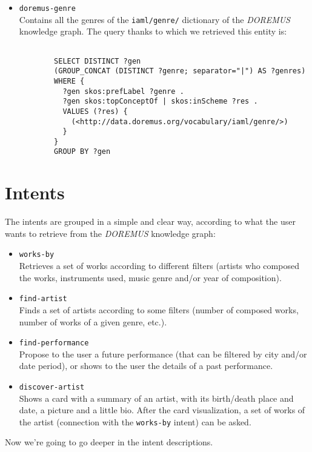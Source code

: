 \begin{itemize}
		\item \texttt{doremus-genre}\\
		Contains all the genres of the \texttt{iaml/genre/} dictionary of the \textit{DOREMUS} knowledge graph. The query thanks to which we retrieved this entity is:
		\begin{lstlisting}
		
		SELECT DISTINCT ?gen
		(GROUP_CONCAT (DISTINCT ?genre; separator="|") AS ?genres)
		WHERE {
		  ?gen skos:prefLabel ?genre .
		  ?gen skos:topConceptOf | skos:inScheme ?res .
		  VALUES (?res) {
		    (<http://data.doremus.org/vocabulary/iaml/genre/>)
		  }
		}
		GROUP BY ?gen
		\end{lstlisting}
	\end{itemize}

	\section{Intents}
	The intents are grouped in a simple and clear way, according to what the user wants to retrieve from the \textit{DOREMUS} knowledge graph:
	\begin{itemize}
		\item \texttt{works-by}\\
		Retrieves a set of works according to different filters (artists who composed the works, instruments used, music genre and/or year of composition).
		\item \texttt{find-artist}\\
		Finds a set of artists according to some filters (number of composed works, number of works of a given genre, etc.).
		\item \texttt{find-performance}\\
		Propose to the user a future performance (that can be filtered by city and/or date period), or shows to the user the details of a past performance.
		\item \texttt{discover-artist}\\
		Shows a card with a summary of an artist, with its birth/death place and date, a picture and a little bio. After the card visualization, a set of works of the artist (connection with the \texttt{works-by} intent) can be asked.
	\end{itemize}
	Now we're going to go deeper in the intent descriptions.
